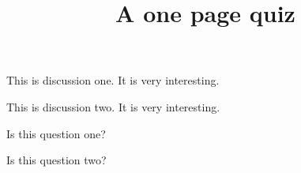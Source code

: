 \documentclass[one page]{webquiz}
\title{A one page quiz}
\begin{document}
  \begin{discussion}[One] This is discussion one. It is very interesting. \end{discussion}
  \begin{discussion}[Two] This is discussion two. It is very interesting. \end{discussion}
  \begin{question} Is this question one? \end{question}
  \begin{question} Is this question two? \end{question}
\end{document}
